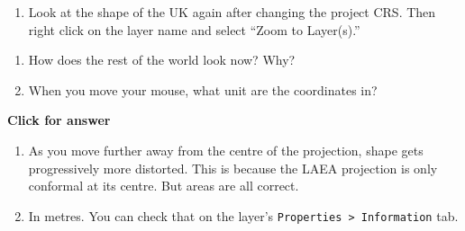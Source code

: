 \documentclass[
  letterpaper,
  DIV=11,
  numbers=noendperiod]{scrreprt}
\providecommand{\tightlist}{%
  \setlength{\itemsep}{0pt}\setlength{\parskip}{0pt}}\usepackage{longtable,booktabs,array}
\begin{document}
\begin{enumerate}
\def\labelenumi{(\arabic{enumi})}
\setcounter{enumi}{53}
\tightlist
\item
  Look at the shape of the UK again after changing the project CRS. Then
  right click on the layer name and select ``Zoom to Layer(s).''
\end{enumerate}

\begin{tcolorbox}[enhanced jigsaw, coltitle=black, toprule=.15mm, breakable, opacitybacktitle=0.6, left=2mm, colback=white, leftrule=.75mm, rightrule=.15mm, colbacktitle=quarto-callout-important-color!10!white, toptitle=1mm, titlerule=0mm, colframe=quarto-callout-important-color-frame, arc=.35mm, bottomtitle=1mm, opacityback=0, bottomrule=.15mm, title=\textcolor{quarto-callout-important-color}{\faExclamation}\hspace{0.5em}{Stop and Think}]

\begin{enumerate}
\def\labelenumi{\alph{enumi})}
\item
  How does the rest of the world look now? Why?
\item
  When you move your mouse, what unit are the coordinates in?
\end{enumerate}

\end{tcolorbox}

\begin{tcolorbox}[enhanced jigsaw, toprule=.15mm, breakable, left=2mm, colframe=quarto-callout-important-color-frame, colback=white, arc=.35mm, leftrule=.75mm, opacityback=0, rightrule=.15mm, bottomrule=.15mm]

\vspace{-3mm}\textbf{Click for answer}\vspace{3mm}

\begin{enumerate}
\def\labelenumi{\alph{enumi})}
\item
  As you move further away from the centre of the projection, shape gets
  progressively more distorted. This is because the LAEA projection is
  only conformal at its centre. But areas are all correct.
\item
  In metres. You can check that on the layer's
  \texttt{Properties\ \textgreater{}\ Information} tab.
\end{enumerate}

\end{tcolorbox}
\end{document}
